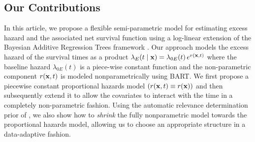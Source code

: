 \documentclass[12pt]{article}
\newcommand{\bfx}{{\bf x}}
\begin{document}



\subsection{Our Contributions}

In this article, we propose a flexible semi-parametric model for estimating excess hazard and the associated net survival function using a log-linear extension of the Bayesian Additive Regression Trees framework \citep{chipman2010bart, hill2019bayesian}. Our approach models the excess hazard of the survival times as a product $\lambda_E(t \mid \bfx) = \lambda_{0E}(t) \, e^{r(\bfx, t)}$ where the baseline hazard $\lambda_{0E}(t)$ is a piece-wise constant function and the non-parametric component $r(\bfx, t)$ is modeled nonparametrically using BART.  We first propose a piecewise constant proportional hazards model $(r(\bfx, t) \equiv r(\bfx))$ and then subsequently extend it to allow the covariates to interact with the time in a completely non-parametric fashion. Using the automatic relevance determination prior of \citet{linero2016bayesian}, we also show how to \emph{shrink} the fully nonparametric model towards the proportional hazards model, allowing us to choose an appropriate structure in a data-adaptive fashion.
\end{document}
